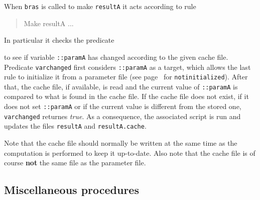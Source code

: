 \documentclass[11pt]{scrartcl}
\newcommand{\bras}{\texttt{bras}}
\begin{document}
\begin{Describe}
  When \bras{} is called to make \texttt{resultA} it acts according to
  rule 
  \begin{quote}
    \ttfamily Make resultA ...
  \end{quote}
  In particular it checks the predicate 
  \begin{quote}
  \end{quote}
  to see if variable \texttt{::paramA} has changed according to the
  given cache file. Predicate \texttt{varchanged} first
  considers \texttt{::paramA} as a target, which allows the last rule
  to initialize it from a parameter file (see
  page~\pageref{pred:notinitialized} for
  \texttt{notinitialized}). After that, the cache file, if available,
  is read and the current value of \texttt{::paramA} is compared to
  what is found in the cache file. If the cache file does not exist,
  if it does not set \texttt{::paramA} or if the current value is
  different from the stored one, \texttt{varchanged} returnes
  \textit{true}. As a consequence, the associated script is run and
  updates the files \texttt{resultA} and \texttt{resultA.cache}.

  Note that the cache file should normally be written at the same time 
  as the computation is performed to keep it up-to-date. Also note
  that the cache file is of course \textbf{not} the same file as the
  parameter file.
\end{Describe}
\subsection{Miscellaneous procedures}

\end{document}
